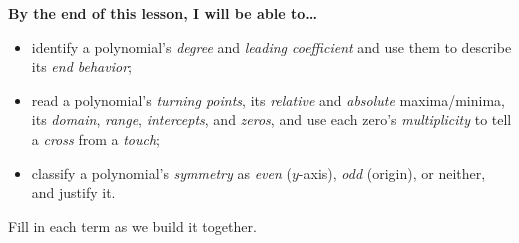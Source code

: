 \documentclass[10pt]{article}
\begin{document}
\namedateperiod

\vspace{0.08in}

\begin{objectivebox}
\textbf{By the end of this lesson, I will be able to\dots}
\begin{itemize}\setlength{\itemsep}{2pt}
  \item identify a polynomial's \emph{degree} and \emph{leading coefficient} and use them to describe its \emph{end behavior};
  \item read a polynomial's \emph{turning points}, its \emph{relative} and \emph{absolute} maxima/minima, its \emph{domain}, \emph{range}, \emph{intercepts}, and \emph{zeros}, and use each zero's \emph{multiplicity} to tell a \emph{cross} from a \emph{touch};
  \item classify a polynomial's \emph{symmetry} as \emph{even} ($y$-axis), \emph{odd} (origin), or neither, and justify it.
\end{itemize}
\end{objectivebox}

\vspace{0.05in}

\begin{vocabbox}
\small
Fill in each term as we build it together.
\vspace{2pt}
\end{vocabbox}
\end{document}
